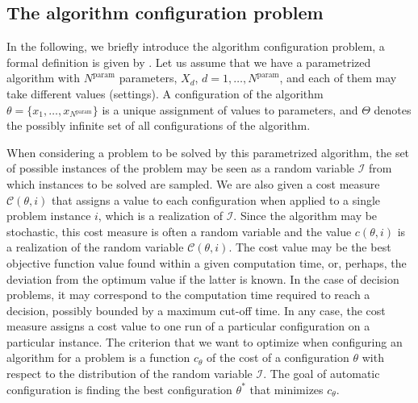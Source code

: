 \documentclass[article,a4paper,nojss,notitle]{jss}
\newcommand{\MANUEL}[1]{{\footnotesize\noindent\textbf{[~MANUEL: #1~]}}}
\newcommand{\Nparam}{\ensuremath{{N^\text{param}}}\xspace}
\renewcommand{\enspace}{}
\begin{document}
\subsection{The algorithm configuration problem}\label{sec:algoconf}

In the following, we briefly introduce the algorithm configuration
problem, a formal definition is given by \citet{Birattari09tuning}. 
%
Let us assume that we have a parametrized algorithm with $\Nparam$
parameters, $X_d$, $d=1,\dotsc,\Nparam$, and each of them may take
different values (settings).
A configuration of the algorithm $\theta=\{x_1,\dotsc,x_\Nparam\}$ is a unique assignment of
values to parameters, and $\Theta$
denotes the possibly infinite set of all configurations of the
algorithm.

When considering a problem to be solved by this parametrized
algorithm, the set of possible instances of the problem may be seen as
a random variable $\mathcal{I}$ from which instances to be solved are
sampled. We are also given a cost measure $\mathcal{C}(\theta, i)$
that assigns a value to each configuration when applied to a single
problem instance $i$, which is a realization of $\mathcal{I}$.
Since the algorithm may be stochastic, this cost
measure is often a random variable and the value $c(\theta, i)$ is a
realization of the random variable $\mathcal{C}(\theta, i)$. The cost
value may be the best objective function value found within a given
computation time, or, perhaps, the deviation from the optimum value if
the latter is known. In the case of decision problems, it may
correspond to the computation time required to reach a decision, possibly
bounded by a maximum cut-off time. In any case, the cost measure
assigns a cost value to one run of a particular configuration on a
particular instance. The criterion that we want to optimize when
configuring an algorithm for a problem is a function $c_\theta$ of the cost of a
configuration $\theta$ with respect to the distribution of the random variable $\mathcal{I}$. 
The goal of automatic configuration is finding the best configuration
$\theta^*$ that minimizes $c_\theta$.
%
\end{document}
